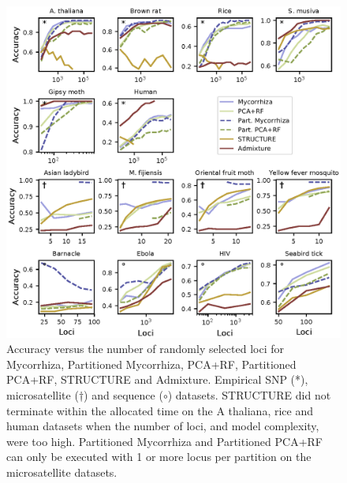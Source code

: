\documentclass[final]{bioinfo}
\begin{document}
\begin{figure}[!tbp]%
    \includegraphics[width=\linewidth]{figure3.eps}
    \caption{Accuracy versus the number of randomly selected loci for Mycorrhiza, Partitioned Mycorrhiza, PCA+RF, Partitioned PCA+RF, STRUCTURE and Admixture. Empirical SNP (*), microsatellite (†) and sequence ($\circ$) datasets. STRUCTURE did not terminate within the allocated time on the A thaliana, rice and human datasets when the number of loci, and model complexity, were too high. Partitioned Mycorrhiza and Partitioned PCA+RF can only be executed with 1 or more locus per partition on the microsatellite datasets. }\label{fig:03}
\end{figure}
\end{document}
